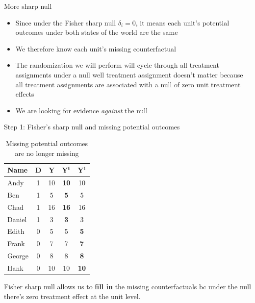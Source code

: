\documentclass{beamer}
\begin{document}
\begin{frame}{More sharp null}

\begin{itemize}
\item Since under the Fisher sharp null $\delta_i=0$, it means each unit's potential outcomes under both states of the world are the same
\item We therefore know each unit's missing counterfactual
\item The randomization we will perform will cycle through all treatment assignments under a null well treatment assignment doesn't matter because all treatment assignments are associated with a null of zero unit treatment effects
\item We are looking for evidence \emph{against} the null 
\end{itemize}

\end{frame}




\begin{frame}{Step 1: Fisher's sharp null and missing potential outcomes}

\begin{table}[htbp]\centering
\begin{center}
\caption{Missing potential outcomes are no longer missing}
\begin{threeparttable}
\begin{tabular}{lcccc}
\toprule
\multicolumn{1}{l}{Name}&
\multicolumn{1}{c}{D}&
\multicolumn{1}{c}{Y}&
\multicolumn{1}{c}{Y$^0$}&
\multicolumn{1}{c}{Y$^1$}\\
\midrule
Andy		& 1 & 10  & \textbf{10} & 10 \\
Ben		& 1 & 5    & \textbf{5} & 5 \\
Chad	& 1 & 16  & \textbf{16} & 16 \\	
Daniel	& 1 &  3   & \textbf{3} & 3 \\
Edith		& 0 & 5    & 5 & \textbf{5} \\
Frank	& 0 & 7    & 7& \textbf{7}  \\
George	& 0 & 8    & 8 & \textbf{8} \\
Hank		& 0 & 10  & 10 & \textbf{10} \\
\bottomrule
\end{tabular}
\end{threeparttable}
\end{center}
\end{table}

Fisher sharp null allows us to \textbf{fill in} the missing counterfactuals bc under the null there's zero treatment effect at the unit level.
	
\end{frame}
\end{document}
